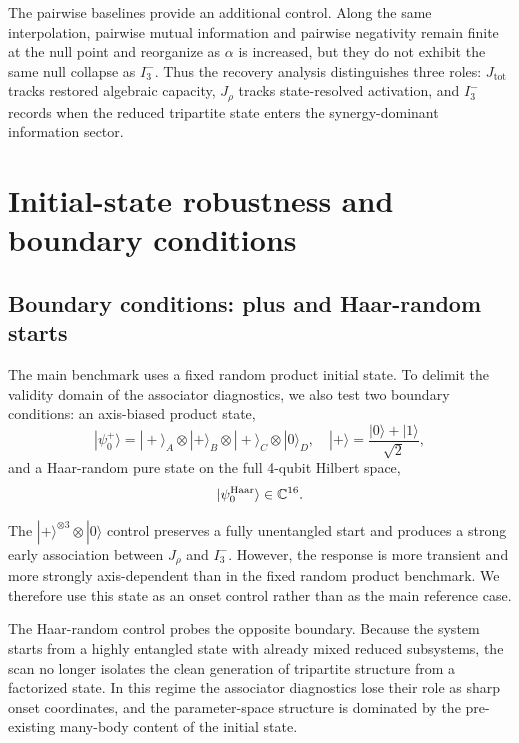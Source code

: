 \documentclass[aps,physrev,preprint,groupedaddress]{revtex4-2}
\begin{document}
The pairwise baselines provide an additional control. Along the same interpolation, pairwise mutual information and pairwise negativity remain finite at the null point and reorganize as $\alpha$ is increased, but they do not exhibit the same null collapse as $I_3^-$. Thus the recovery analysis distinguishes three roles: $J_{\mathrm{tot}}$ tracks restored algebraic capacity, $J_\rho$ tracks state-resolved activation, and $I_3^-$ records when the reduced tripartite state enters the synergy-dominant information sector.


\section{Initial-state robustness and boundary conditions}\label{sm:initial-state}
\subsection{Boundary conditions: plus and Haar-random starts}\label{sm:initial-state-boundary}

The main benchmark uses a fixed random product initial state. To delimit the validity domain of the associator diagnostics, we also test two boundary conditions: an axis-biased product state,
\begin{equation}
    |\psi_0^+\rangle=|+\rangle_A\otimes |+\rangle_B\otimes |+\rangle_C \otimes |0\rangle_D,
    \quad |+\rangle=\frac{|0\rangle+|1\rangle}{\sqrt2},
\end{equation}
and a Haar-random pure state on the full 4-qubit Hilbert space,
\begin{equation}
    |\psi_0^{\rm Haar}\rangle\in\mathbb C^{16}.
\end{equation}

The $|+\rangle^{\otimes 3}\otimes |0\rangle$ control preserves a fully unentangled start and produces a strong early association between $J_\rho$ and $I_3^-$. However, the response is more transient and more strongly axis-dependent than in the fixed random product benchmark.
We therefore use this state as an onset control rather than as the main reference case.

The Haar-random control probes the opposite boundary. Because the system starts from a highly entangled state with already mixed reduced subsystems, the scan no longer isolates the clean generation of tripartite structure from a factorized state. In this regime the associator diagnostics lose their role as sharp onset coordinates, and the parameter-space structure is dominated by the pre-existing many-body content of the initial state.
\end{document}
